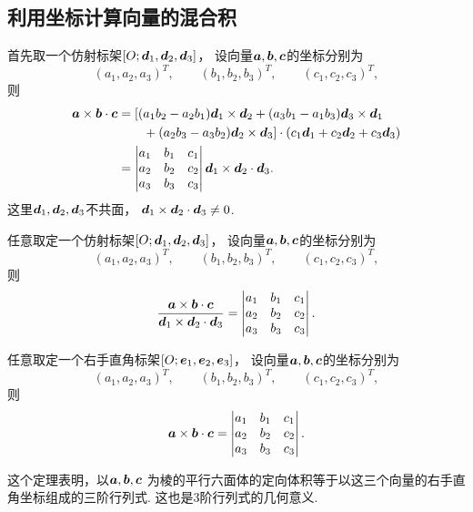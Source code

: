 \subsection{利用坐标计算向量的混合积}
首先取一个仿射标架\([O;\boldsymbol{d}_1,\boldsymbol{d}_2,\boldsymbol{d}_3]\)，
设向量\(\boldsymbol{a},\boldsymbol{b},\boldsymbol{c}\)的坐标分别为\[
	(a_1,a_2,a_3)^T, \qquad
	(b_1,b_2,b_3)^T, \qquad
	(c_1,c_2,c_3)^T,
\]
则\begin{equation}
\begin{split}
	\boldsymbol{a}\times\boldsymbol{b}\cdot\boldsymbol{c}
	&= [(a_1 b_2 - a_2 b_1) \boldsymbol{d}_1 \times \boldsymbol{d}_2
	+ (a_3 b_1 - a_1 b_3) \boldsymbol{d}_3 \times \boldsymbol{d}_1 \\
	&\hspace{20pt}
	+ (a_2 b_3 - a_3 b_2) \boldsymbol{d}_2 \times \boldsymbol{d}_3]
	\cdot (c_1 \boldsymbol{d}_1 + c_2 \boldsymbol{d}_2 + c_3 \boldsymbol{d}_3) \\
	&= \begin{vmatrix}
		a_1 & b_1 & c_1 \\
		a_2 & b_2 & c_2 \\
		a_3 & b_3 & c_3
	\end{vmatrix}
	\boldsymbol{d}_1 \times \boldsymbol{d}_2 \cdot \boldsymbol{d}_3.
\end{split}
\end{equation}
这里\(\boldsymbol{d}_1,\boldsymbol{d}_2,\boldsymbol{d}_3\)不共面，
\(\boldsymbol{d}_1\times\boldsymbol{d}_2\cdot\boldsymbol{d}_3\neq0\).

\begin{theorem}
任意取定一个仿射标架\([O;\boldsymbol{d}_1,\boldsymbol{d}_2,\boldsymbol{d}_3]\)，
设向量\(\boldsymbol{a},\boldsymbol{b},\boldsymbol{c}\)的坐标分别为\[
	(a_1,a_2,a_3)^T, \qquad
	(b_1,b_2,b_3)^T, \qquad
	(c_1,c_2,c_3)^T,
\]
则\begin{equation}
	\frac{\boldsymbol{a}\times\boldsymbol{b}\cdot\boldsymbol{c}}{\boldsymbol{d}_1\times\boldsymbol{d}_2\cdot\boldsymbol{d}_3}
	= \begin{vmatrix}
		a_1 & b_1 & c_1 \\
		a_2 & b_2 & c_2 \\
		a_3 & b_3 & c_3
	\end{vmatrix}.
\end{equation}
\end{theorem}

\begin{theorem}
任意取定一个右手直角标架\([O;\boldsymbol{e}_1,\boldsymbol{e}_2,\boldsymbol{e}_3]\)，
设向量\(\boldsymbol{a},\boldsymbol{b},\boldsymbol{c}\)的坐标分别为\[
	(a_1,a_2,a_3)^T, \qquad
	(b_1,b_2,b_3)^T, \qquad
	(c_1,c_2,c_3)^T,
\]
则\begin{equation}
	\boldsymbol{a}\times\boldsymbol{b}\cdot\boldsymbol{c}
	= \begin{vmatrix}
		a_1 & b_1 & c_1 \\
		a_2 & b_2 & c_2 \\
		a_3 & b_3 & c_3
	\end{vmatrix}.
\end{equation}
\end{theorem}
这个定理表明，以\(\boldsymbol{a},\boldsymbol{b},\boldsymbol{c}\)
为棱的平行六面体的定向体积等于以这三个向量的右手直角坐标组成的三阶行列式.
这也是3阶行列式的几何意义.

